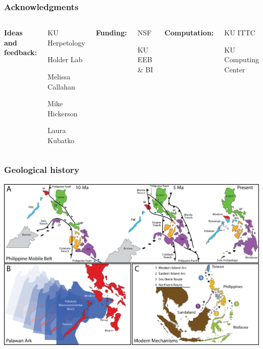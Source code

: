 \begin{frame}
    \frametitle{Acknowledgments}
    \begin{columns}[c]
            {\bf Ideas and feedback:}
            \begin{myitemize}
                \item KU Herpetology
                \item Holder Lab
                \item Melissa Callahan
                \item Mike Hickerson
                \item Laura Kubatko
            \end{myitemize}
            {\bf Funding:}
            \begin{myitemize}
                \item NSF
                \item KU EEB \& BI
            \end{myitemize}
            {\bf Computation:}
            \begin{myitemize}
                \item KU ITTC
                \item KU Computing Center
            \end{myitemize}
    \end{columns}
\end{frame}


\begin{frame}[noframenumbering]
    \frametitle{Geological history}
    \includegraphics[width=\textwidth]{images/maps/arees-fig3.png}
\end{frame}
    
